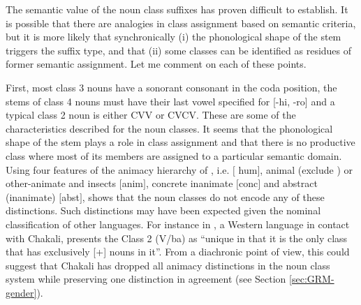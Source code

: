 \begin{exe}
\begin{exe}
\begin{exe}
\begin{exe}
\begin{exe}
\begin{exe}
The semantic value of the noun class suffixes has proven difficult to
establish. It is possible that there are analogies in class assignment based on semantic criteria, but it is more likely that synchronically (i) the phonological
shape of the stem triggers the suffix type, and that (ii) some classes can be
identified as residues of former semantic assignment. Let me comment on each of 
these
points. 

First, most class 3 nouns have  a sonorant consonant in the coda position,
the stems of  class 4 nouns must have their last vowel specified for  [{\sc -hi,
-ro}] and a typical class 2 noun is either   CVV or CVCV.  These are some of
the characteristics  described for the noun classes. It seems that the
phonological
shape of the stem plays a role in class assignment and that there is no
productive class
where most of its  members are assigned to a particular semantic domain.  Using
four features of the animacy hierarchy
of  \citet{Comr89}, i.e.   $[${\sc
hum}$]$, animal (exclude ) or other-animate
and insects $[${\sc anim}$]$, concrete inanimate $[${\sc conc}$]$ and abstract
(inanimate) $[${\sc abst}$]$,  \citet{brin08} shows that the noun
classes  do not encode any of these distinctions. Such
distinctions may have
been  expected given the nominal classification of other  languages. For
instance in , a Western   language in contact with
Chakali, \citet[124]{Bodo94} presents the Class 2 (V/ba) as ``unique in that it
is the only class that has exclusively [+] nouns in it''. From a
diachronic point of view, this could suggest that Chakali has dropped all animacy
distinctions in the noun class system while preserving one distinction in
agreement (see Section \ref{sec:GRM-gender}).



\end{exe}
\end{exe}
\end{exe}
\end{exe}
\end{exe}
\end{exe}
